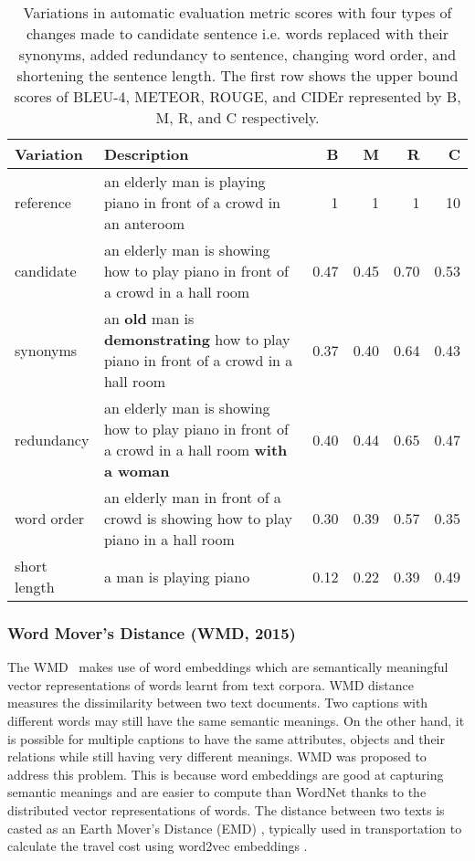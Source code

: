 \documentclass[10pt,journal,compsoc]{IEEEtran}
\begin{document}
\begin{table*}[ht]
  \small
  \centering
  \caption{Variations in automatic evaluation metric scores with four types of changes made to candidate sentence i.e. words replaced with their synonyms, added redundancy to sentence, changing word order, and shortening the sentence length. The first row shows the upper bound scores of BLEU-4, METEOR, ROUGE, and CIDEr represented by B, M, R, and C respectively.}
  \vspace{-4mm}
    \begin{tabular}{lp{20 em}rrrr}
    \hline
    Variation & Description & B & M & R & C \\
    \hline
    reference & an elderly man is playing piano in front of a crowd in an anteroom & 1 & 1 & 1 & 10 \\
    candidate  & an elderly man is showing how to play piano in front of a crowd in a hall room & 0.47 & 0.45 & 0.70 & 0.53 \\
    \hline
    synonyms & an \textbf{old} man is \textbf{demonstrating} how to play piano in front of a crowd in a hall room & 0.37 & 0.40 & 0.64 & 0.43 \\
    redundancy & an elderly man is showing how to play piano in front of a crowd in a hall room \textbf{with a woman} & 0.40 & 0.44  & 0.65 & 0.47 \\
    word order &  an elderly man in front of a crowd is showing how to play piano in a hall room & 0.30 & 0.39 & 0.57 & 0.35 \\
    short length &  a man is playing piano & 0.12 & 0.22 & 0.39 & 0.49 \\
    \hline
    \end{tabular}%
  \label{tab:evalmetricscompare}%
\end{table*}

\subsubsection{Word Mover's Distance (WMD, 2015)}
The WMD~\cite{kusner2015word} makes use of word embeddings which are semantically meaningful vector representations of words learnt from text corpora. WMD distance measures the dissimilarity between two text documents. Two captions with different words may still have the same semantic meanings. On the other hand, it is possible for multiple captions to have the same attributes, objects and their relations while still having very different meanings. WMD was proposed to address this problem. This is because word embeddings are good at capturing semantic meanings and are easier to compute than WordNet thanks to the distributed vector representations of words. The distance between two texts is casted as an Earth Mover's Distance (EMD) \cite{rubner2000earth}, typically used in transportation to calculate the travel cost using word2vec embeddings \cite{mikolov2013distributed}.
\end{document}

